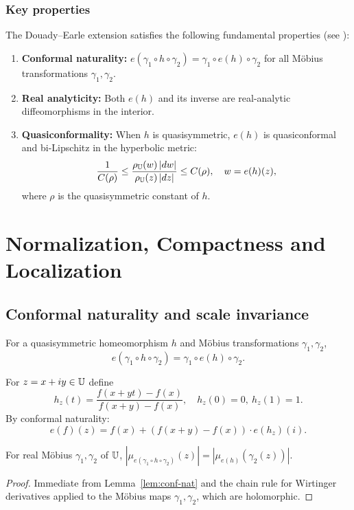 \subsubsection*{Key properties}

The Douady--Earle extension satisfies the following fundamental properties (see \cite{DE}):
\begin{enumerate}
	\item \textbf{Conformal naturality:} $e(\gamma_1 \circ h \circ \gamma_2) = \gamma_1 \circ e(h) \circ \gamma_2$ for all M\"obius transformations $\gamma_1, \gamma_2$.
	\item \textbf{Real analyticity:} Both $e(h)$ and its inverse are real-analytic diffeomorphisms in the interior.
	\item \textbf{Quasiconformality:} When $h$ is quasisymmetric, $e(h)$ is quasiconformal and bi-Lipschitz in the hyperbolic metric:
	\[
	\frac{1}{C(\rho)} \leq \frac{\rho_{\mathbb{U}}(w)\,|dw|}{\rho_{\mathbb{U}}(z)\,|dz|} \leq C(\rho), \quad w = e(h)(z),
	\]
	where $\rho$ is the quasisymmetric constant of $h$.
\end{enumerate}

\section{Normalization, Compactness and Localization}\label{sec:normal}

\subsection{Conformal naturality and scale invariance}\label{ss:conf-nat}


\begin{lemma}\label{lem:conf-nat}
	For a quasisymmetric homeomorphism $h$ and M\"obius transformations $\gamma_1, \gamma_2$,
	\[
	e(\gamma_1 \circ h \circ \gamma_2) = \gamma_1 \circ e(h) \circ \gamma_2.
	\]
\end{lemma}

For $z = x + iy \in \mathbb{U}$ define
\[
h_z(t) = \frac{f(x + yt) - f(x)}{f(x+y) - f(x)}, \quad h_z(0) = 0,\ h_z(1) = 1.
\]
By conformal naturality:
\[
e(f)(z) = f(x) + (f(x+y) - f(x)) \cdot e(h_z)(i).
\]

\begin{lemma}\label{lem:mobius_preserves_dilatation}
	For real M\"obius $\gamma_1,\gamma_2$ of $\mathbb{U}$,
	$|\mu_{e(\gamma_1\circ h\circ\gamma_2)}(z)|=|\mu_{e(h)}(\gamma_2(z))|$.
\end{lemma}
\begin{proof}
	Immediate from Lemma~\ref{lem:conf-nat} and the chain rule for Wirtinger derivatives
	applied to the M\"obius maps $\gamma_1,\gamma_2$, which are holomorphic.
\end{proof}

